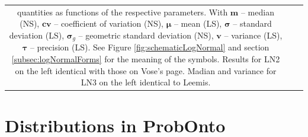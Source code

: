 {\begin{center}
\begin{longtable}{ccc}
{quantities as functions of the respective parameters. With $\boldsymbol m$ -- median (NS), 
$\boldsymbol {cv}$ -- coefficient of variation (NS), $\boldsymbol \mu$ -- mean (LS), 
$\boldsymbol \sigma$ -- standard deviation (LS), $\boldsymbol \sigma_g$ -- geometric standard 
deviation (NS), $\boldsymbol v$ -- variance (LS), 
$\boldsymbol \tau$ -- precision (LS). See Figure \ref{fig:schematicLogNormal} and 
section \ref{subsec:logNormalForms} for the meaning of the symbols.
Results for LN2 on the left identical with those on Vose's page.
Madian and variance for LN3 on the left identical to Leemis.}
\label{figTable:logNormalParameterisations}
\vspace{-2.5em}
\end{longtable}
\end{center}

\section{Distributions in ProbOnto}
}
